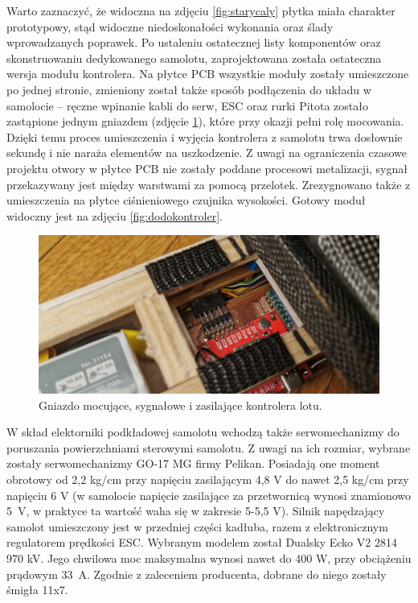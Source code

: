 \documentclass[12pt, a4paper]{article}
\begin{document}
Warto zaznaczyć, że widoczna na zdjęciu \ref{fig:starycaly} płytka miała charakter prototypowy, stąd widoczne niedoskonałości wykonania oraz ślady wprowadzanych poprawek. Po ustaleniu ostatecznej listy komponentów oraz skonstruowaniu dedykowanego samolotu, zaprojektowana została ostateczna wersja modułu kontrolera. Na płytce PCB wszystkie moduły zostały umieszczone po jednej stronie, zmieniony został także sposób podłączenia do układu w samolocie – ręczne wpinanie kabli do serw, ESC oraz rurki Pitota zostało zastąpione jednym gniazdem (zdjęcie \ref{fig:gniazdo}), które przy okazji pełni rolę mocowania. Dzięki temu proces umieszczenia i wyjęcia kontrolera z samolotu trwa dosłownie sekundę i nie naraża elementów na uszkodzenie. Z uwagi na ograniczenia czasowe projektu otwory w płytce PCB nie zostały poddane procesowi metalizacji, sygnał przekazywany jest między warstwami za pomocą przelotek. Zrezygnowano także z umieszczenia na płytce ciśnieniowego czujnika wysokości. Gotowy moduł widoczny jest na zdjęciu \ref{fig:dodokontroler}.

   \begin{figure}[ht]
    \centering
    \includegraphics[width=1\textwidth]{gniazdo}
    \caption{Gniazdo mocujące, sygnałowe i zasilające kontrolera lotu.}
    \label{fig:gniazdo}
\end{figure}


W skład elektorniki podkładowej samolotu wchodzą także serwomechanizmy do poruszania powierzchniami sterowymi samolotu. Z uwagi na ich rozmiar, wybrane zostały serwomechanizmy GO-17 MG firmy Pelikan. Posiadają one moment obrotowy od 2,2 kg/cm przy napięciu zasilającym 4,8 V do nawet 2,5 kg/cm przy napięciu 6 V (w samolocie napięcie zasilające za przetwornicą wynosi znamionowo 5~V, w praktyce ta wartość waha się w zakresie 5-5,5 V). Silnik napędzający samolot umieszczony jest w przedniej części kadłuba, razem z elektronicznym regulatorem prędkości ESC. Wybranym modelem został Dualsky Ecko V2 2814 970 kV. Jego chwilowa moc maksymalna wynosi nawet do 400 W, przy obciążeniu prądowym 33~A. Zgodnie z zaleceniem producenta, dobrane do niego zostały śmigła 11x7.  
\end{document}
